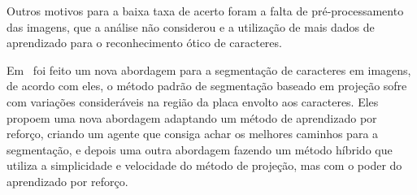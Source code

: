 Outros motivos para a baixa taxa de acerto foram a falta de pré-processamento
das imagens, que a análise não considerou e a utilização de mais dados de
aprendizado para o reconhecimento ótico de caracteres.

Em~\cite{abtahi2015deep} foi feito um nova abordagem para a segmentação de
caracteres em imagens, de acordo com eles, o método padrão de segmentação
baseado em projeção sofre com variações consideráveis na região da placa envolto
aos caracteres. Eles propoem uma nova abordagem adaptando um método de
aprendizado por reforço, criando um agente que consiga achar os melhores
caminhos para a segmentação, e depois uma outra abordagem fazendo um método
híbrido que utiliza a simplicidade e velocidade do método de projeção, mas com o
poder do aprendizado por reforço.
